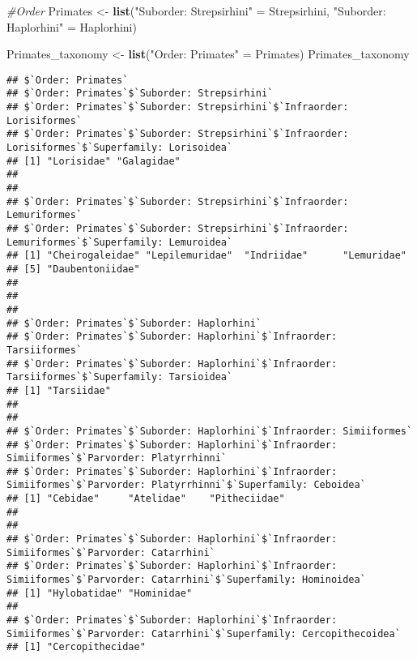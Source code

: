 \documentclass[]{article}
\newenvironment{Shaded}{\begin{snugshade}}{\end{snugshade}}
\newcommand{\KeywordTok}[1]{\textcolor[rgb]{0.13,0.29,0.53}{\textbf{#1}}}
\newcommand{\StringTok}[1]{\textcolor[rgb]{0.31,0.60,0.02}{#1}}
\newcommand{\CommentTok}[1]{\textcolor[rgb]{0.56,0.35,0.01}{\textit{#1}}}
\newcommand{\NormalTok}[1]{#1}
\begin{document}
\begin{Shaded}
\begin{Highlighting}[]
\CommentTok{#Order}
\NormalTok{Primates <-}\StringTok{ }\KeywordTok{list}\NormalTok{(}\StringTok{"Suborder: Strepsirhini"}\NormalTok{ =}\StringTok{ }\NormalTok{Strepsirhini, }\StringTok{"Suborder: Haplorhini"}\NormalTok{ =}\StringTok{ }\NormalTok{Haplorhini)}

\NormalTok{Primates_taxonomy <-}\StringTok{ }\KeywordTok{list}\NormalTok{(}\StringTok{"Order: Primates"}\NormalTok{ =}\StringTok{ }\NormalTok{Primates)}
\NormalTok{Primates_taxonomy}
\end{Highlighting}
\end{Shaded}

\begin{verbatim}
## $`Order: Primates`
## $`Order: Primates`$`Suborder: Strepsirhini`
## $`Order: Primates`$`Suborder: Strepsirhini`$`Infraorder: Lorisiformes`
## $`Order: Primates`$`Suborder: Strepsirhini`$`Infraorder: Lorisiformes`$`Superfamily: Lorisoidea`
## [1] "Lorisidae" "Galagidae"
## 
## 
## $`Order: Primates`$`Suborder: Strepsirhini`$`Infraorder: Lemuriformes`
## $`Order: Primates`$`Suborder: Strepsirhini`$`Infraorder: Lemuriformes`$`Superfamily: Lemuroidea`
## [1] "Cheirogaleidae" "Lepilemuridae"  "Indriidae"      "Lemuridae"     
## [5] "Daubentoniidae"
## 
## 
## 
## $`Order: Primates`$`Suborder: Haplorhini`
## $`Order: Primates`$`Suborder: Haplorhini`$`Infraorder: Tarsiiformes`
## $`Order: Primates`$`Suborder: Haplorhini`$`Infraorder: Tarsiiformes`$`Superfamily: Tarsioidea`
## [1] "Tarsiidae"
## 
## 
## $`Order: Primates`$`Suborder: Haplorhini`$`Infraorder: Simiiformes`
## $`Order: Primates`$`Suborder: Haplorhini`$`Infraorder: Simiiformes`$`Parvorder: Platyrrhinni`
## $`Order: Primates`$`Suborder: Haplorhini`$`Infraorder: Simiiformes`$`Parvorder: Platyrrhinni`$`Superfamily: Ceboidea`
## [1] "Cebidae"     "Atelidae"    "Pitheciidae"
## 
## 
## $`Order: Primates`$`Suborder: Haplorhini`$`Infraorder: Simiiformes`$`Parvorder: Catarrhini`
## $`Order: Primates`$`Suborder: Haplorhini`$`Infraorder: Simiiformes`$`Parvorder: Catarrhini`$`Superfamily: Hominoidea`
## [1] "Hylobatidae" "Hominidae"  
## 
## $`Order: Primates`$`Suborder: Haplorhini`$`Infraorder: Simiiformes`$`Parvorder: Catarrhini`$`Superfamily: Cercopithecoidea`
## [1] "Cercopithecidae"
\end{verbatim}
\end{document}
